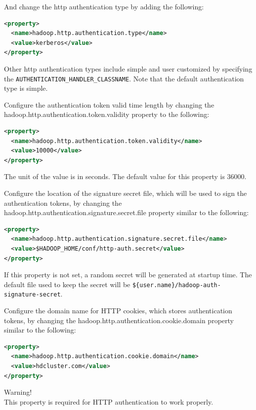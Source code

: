 And change the http authentication type by adding the following:
\lstset{style=bashstyle}
\begin{lstlisting}[language=XML]
<property>
  <name>hadoop.http.authentication.type</name>
  <value>kerberos</value>
</property>
\end{lstlisting}

Other http authentication types include simple and user customized by specifying the \verb|AUTHENTICATION_HANDLER_CLASSNAME|. Note that the default authentication type is simple.

Configure the authentication token valid time length by changing the hadoop.http.authentication.token.validity property to the following:
\lstset{style=bashstyle}
\begin{lstlisting}[language=XML]
<property>
  <name>hadoop.http.authentication.token.validity</name>
  <value>10000</value>
</property>
\end{lstlisting}

The unit of the value is in seconds.  The default value for this property is 36000.

Configure the location of the signature secret file, which will be used to sign the authentication tokens, by changing the  hadoop.http.authentication.signature.secret.file property similar to the following:
\lstset{style=bashstyle}
\begin{lstlisting}[language=XML]
<property>
  <name>hadoop.http.authentication.signature.secret.file</name>
  <value>$HADOOP_HOME/conf/http-auth.secret</value>
</property>
\end{lstlisting}

If this property is not set, a random secret will be generated at startup time. The default file used to keep the secret will be \verb|${user.name}/hadoop-auth-signature-secret|.

Configure the domain name for HTTP cookies, which stores authentication tokens, by changing the hadoop.http.authentication.cookie.domain property similar to the following:
\lstset{style=bashstyle}
\begin{lstlisting}[language=XML]
<property>
  <name>hadoop.http.authentication.cookie.domain</name>
  <value>hdcluster.com</value>
</property>
\end{lstlisting}
\begin{warning}
Warning! \\
This property is required for HTTP authentication to work properly.
\end{warning}

